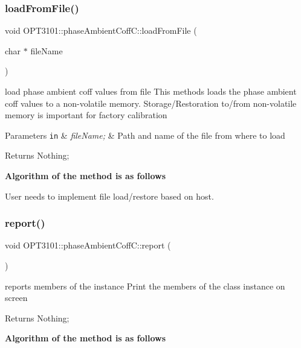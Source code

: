 \subsubsection{\texorpdfstring{load\+From\+File()}{loadFromFile()}}
{\footnotesize\ttfamily void O\+P\+T3101\+::phase\+Ambient\+Coff\+C\+::load\+From\+File (\begin{DoxyParamCaption}\item[{char $\ast$}]{file\+Name }\end{DoxyParamCaption})}



load phase ambient coff values from file This methods loads the phase ambient coff values to a non-\/volatile memory. Storage/\+Restoration to/from non-\/volatile memory is important for factory calibration 


\begin{DoxyParams}[1]{Parameters}
\mbox{\tt in}  & {\em file\+Name;} & Path and name of the file from where to load \\
\hline
\end{DoxyParams}
\begin{DoxyReturn}{Returns}
Nothing; 
\end{DoxyReturn}
{\bfseries Algorithm of the method is as follows}


\begin{DoxyItemize}
\item User needs to implement file load/restore based on host. 
\end{DoxyItemize}\mbox{\label{class_o_p_t3101_1_1phase_ambient_coff_c_afba22e085a341c2d9b1add1532ea06a1}} 
\subsubsection{\texorpdfstring{report()}{report()}}
{\footnotesize\ttfamily void O\+P\+T3101\+::phase\+Ambient\+Coff\+C\+::report (\begin{DoxyParamCaption}{ }\end{DoxyParamCaption})}



reports members of the instance Print the members of the class instance on screen 

\begin{DoxyReturn}{Returns}
Nothing; 
\end{DoxyReturn}
{\bfseries Algorithm of the method is as follows}


